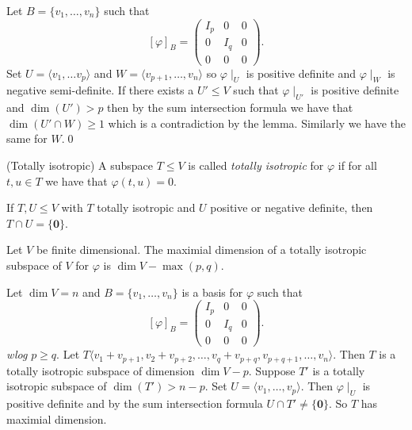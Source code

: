 \documentclass{article}
\begin{document}
Let $ B=\{v_1,\dots, v_n\} $ such that
\[
	[\varphi]_B=\begin{pmatrix}
		I_p & 0 & 0 \\
		0 & I_q & 0 \\
		0 & 0 & 0
	\end{pmatrix}.
\]
Set $ U=\langle v_1,\dots v_p\rangle $ and $ W=\langle v_{p+1},\dots, v_n\rangle $ so $ \varphi\mid_U $ is positive definite and $ \varphi\mid_W $ is negative semi-definite. If there exists a $ U'\le V $ such that $ \varphi\mid_{U'} $ is positive definite and $ \dim(U')>p $ then by the sum intersection formula we have that $ \dim(U'\cap W)\ge 1 $ which is a contradiction by the lemma. Similarly we have the same for $ W $.\qed
\begin{definition}
	(Totally isotropic) A subspace $ T\le V $ is called \textit{totally isotropic} for $ \varphi $ if for all $ t,u\in T $ we have that $ \varphi(t,u)=0 $.
\end{definition}
\begin{remark}
	If $ T,U \le V $ with $ T $ totally isotropic and $ U $ positive or negative definite, then $ T\cap U = \{\mathbf 0\} $.
\end{remark}
\begin{proposition}
  Let $ V $ be finite dimensional. The maximial dimension of a totally isotropic subspace of $ V $ for $ \varphi $ is $ \dim V-\max(p,q) $.
\end{proposition}
\pf Let $ \dim V=n $ and $ B=\{v_1,\dots, v_n\} $ is a basis for $ \varphi $ such that 
\[
	[\varphi]_B=\begin{pmatrix}
		I_p & 0 & 0 \\
		0 & I_q & 0 \\
		0 & 0 & 0
	\end{pmatrix}.
\]
\textit{wlog} $ p\ge q $. Let $ T\langle v_1+v_{p+1}, v_2+v_{p+2},\dots, v_q+v_{p+q}, v_{p+q+1},\dots, v_n\rangle $. Then $ T $ is a totally isotropic subspace of dimension $ \dim V-p $. Suppose $ T' $ is a totally isotropic subspace of $ \dim(T')>n-p $. Set $ U=\langle v_1,\dots, v_p \rangle$. Then $ \varphi\mid_U $ is positive definite and by the sum intersection formula $ U\cap T'\ne \{\mathbf 0\} $. So $ T $ has maximial dimension.
\end{document}
